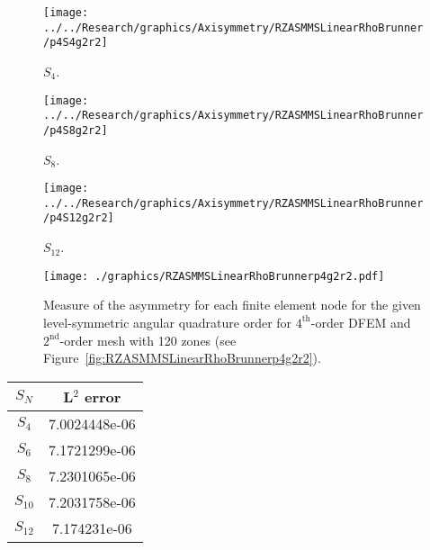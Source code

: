 \documentclass[12pt]{article}
\begin{document}
\begin{sidewaysfigure}[!htb]
\centering
\begin{subfigure}{0.33\textwidth}
\texttt{[image: ../../Research/graphics/Axisymmetry/RZASMMSLinearRhoBrunner/p4S4g2r2]}
\caption{$S_4$.}
\end{subfigure}%
\begin{subfigure}{0.33\textwidth}
\texttt{[image: ../../Research/graphics/Axisymmetry/RZASMMSLinearRhoBrunner/p4S8g2r2]}
\caption{$S_8$.}
\end{subfigure}%
\begin{subfigure}{0.33\textwidth}
\texttt{[image: ../../Research/graphics/Axisymmetry/RZASMMSLinearRhoBrunner/p4S12g2r2]}
\caption{$S_{12}$.}
\end{subfigure}
\caption{Relative asymmetry for $4^\text{th}$-order finite elements on a $2^\text{nd}$-order mesh for given order of level-symmetric angular quadrature.}
\label{fig:RZASMMSLinearRhoBrunnerp4g2r2}
\end{sidewaysfigure}

\begin{figure}[!htb]
\centering
\texttt{[image: ./graphics/RZASMMSLinearRhoBrunnerp4g2r2.pdf]}
\caption{Measure of the asymmetry for each finite element node for the given level-symmetric angular quadrature order for $4^\text{th}$-order DFEM and $2^\text{nd}$-order mesh with 120 zones (see Figure~\ref{fig:RZASMMSLinearRhoBrunnerp4g2r2}).}
\label{fig:RZASMMSLinearRhoBrunnerp4g2r2Nodes}
\end{figure}

\begin{table}[!htb]
\centering
{\renewcommand{\arraystretch}{1.5}
\begin{tabular}{|c|c|}
\hline
$S_N$ & L$^2$ error \\\hline
$S_4$ & 7.0024448e-06 \\\hline
$S_6$ & 7.1721299e-06 \\\hline
$S_8$ & 7.2301065e-06 \\\hline
$S_{10}$ & 7.2031758e-06 \\\hline
$S_{12}$ & 7.174231e-06 \\\hline
\end{tabular}}
\end{table}
\end{document}
